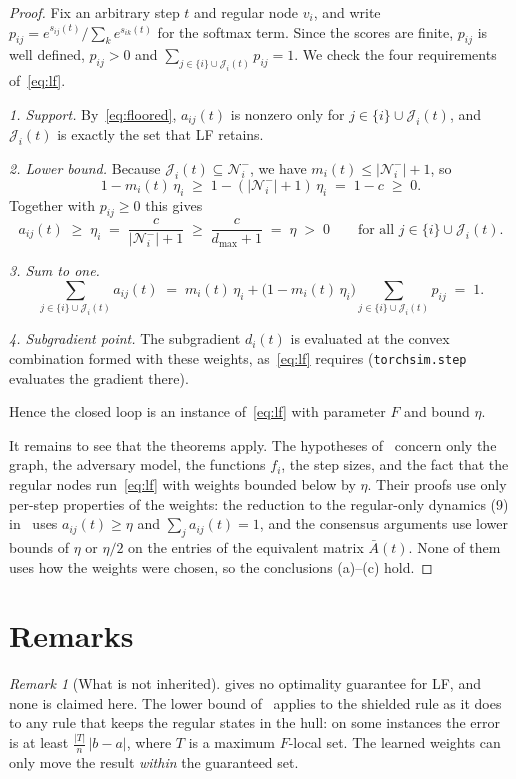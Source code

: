 \documentclass[11pt]{article}
\theoremstyle{definition}
\theoremstyle{remark}
\newtheorem*{remark}{Remark}
\newcommand{\Nin}{\mathcal{N}_i^{-}}
\newcommand{\J}{\mathcal{J}_i(t)}
\newcommand{\code}[1]{\texttt{#1}}
\begin{document}
\begin{proof}
Fix an arbitrary step $t$ and regular node $v_i$, and write $p_{ij} = e^{s_{ij}(t)} / \sum_{k} e^{s_{ik}(t)}$ for the softmax term. Since the scores are finite, $p_{ij}$ is well defined, $p_{ij} > 0$ and $\sum_{j \in \{i\}\cup\J} p_{ij} = 1$. We check the four requirements of~\eqref{eq:lf}.

\emph{1. Support.} By~\eqref{eq:floored}, $a_{ij}(t)$ is nonzero only for $j \in \{i\} \cup \J$, and $\J$ is exactly the set that LF retains.

\emph{2. Lower bound.} Because $\J \subseteq \Nin$, we have $m_i(t) \le |\Nin| + 1$, so
\[
  1 - m_i(t)\,\eta_i \;\ge\; 1 - (|\Nin|+1)\,\eta_i \;=\; 1 - c \;\ge\; 0.
\]
Together with $p_{ij} \ge 0$ this gives
\[
  a_{ij}(t) \;\ge\; \eta_i \;=\; \frac{c}{|\Nin|+1} \;\ge\; \frac{c}{d_{\max}+1} \;=\; \eta \;>\; 0
  \qquad \text{for all } j \in \{i\}\cup\J.
\]

\emph{3. Sum to one.}
\[
  \sum_{j \in \{i\}\cup\J} a_{ij}(t) \;=\; m_i(t)\,\eta_i + \bigl(1 - m_i(t)\,\eta_i\bigr) \sum_{j \in \{i\}\cup\J} p_{ij} \;=\; 1.
\]

\emph{4. Subgradient point.} The subgradient $d_i(t)$ is evaluated at the convex combination formed with these weights, as~\eqref{eq:lf} requires (\code{torchsim.step} evaluates the gradient there).

Hence the closed loop is an instance of~\eqref{eq:lf} with parameter $F$ and bound $\eta$.

It remains to see that the theorems apply. The hypotheses of~\cite[Thms.~6.1, 6.4, 7.1]{sg2019} concern only the graph, the adversary model, the functions $f_i$, the step sizes, and the fact that the regular nodes run~\eqref{eq:lf} with weights bounded below by $\eta$. Their proofs use only per-step properties of the weights: the reduction to the regular-only dynamics (9) in~\cite[Prop.~5.1]{sg2019} uses $a_{ij}(t) \ge \eta$ and $\sum_j a_{ij}(t) = 1$, and the consensus arguments use lower bounds of $\eta$ or $\eta/2$ on the entries of the equivalent matrix $\bar{A}(t)$. None of them uses how the weights were chosen, so the conclusions (a)--(c) hold.
\end{proof}

\section{Remarks}

\begin{remark}[What is not inherited]
\cite{sg2019} gives no optimality guarantee for LF, and none is claimed here. The lower bound of~\cite[Prop.~8.1]{sg2019} applies to the shielded rule as it does to any rule that keeps the regular states in the hull: on some instances the error is at least $\frac{|T|}{n}\,|b-a|$, where $T$ is a maximum $F$-local set. The learned weights can only move the result \emph{within} the guaranteed set.
\end{remark}
\end{document}
